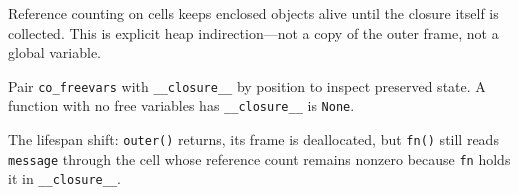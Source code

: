 Reference counting on cells keeps enclosed objects alive until the closure itself is collected. This is explicit heap indirection---not a copy of the outer frame, not a global variable.

Pair \texttt{co\_freevars} with \texttt{\_\_closure\_\_} by position to inspect preserved state. A function with no free variables has \texttt{\_\_closure\_\_} is \texttt{None}.

The lifespan shift: \texttt{outer()} returns, its frame is deallocated, but \texttt{fn()} still reads \texttt{message} through the cell whose reference count remains nonzero because \texttt{fn} holds it in \texttt{\_\_closure\_\_}.
